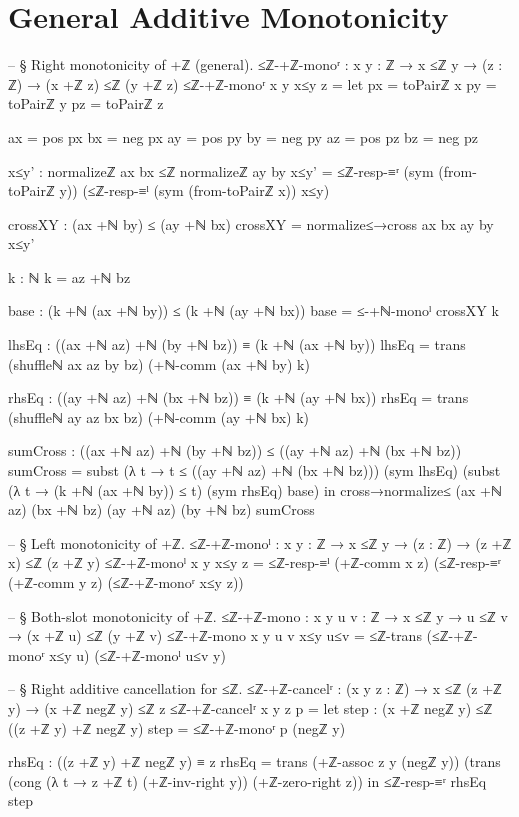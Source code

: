 \documentclass[11pt,a4paper]{book}
\begin{document}
\section{General Additive Monotonicity}

\begin{code}
-- § Right monotonicity of +ℤ (general).
≤ℤ-+ℤ-monoʳ : {x y : ℤ} → x ≤ℤ y → (z : ℤ) → (x +ℤ z) ≤ℤ (y +ℤ z)
≤ℤ-+ℤ-monoʳ {x} {y} x≤y z =
  let
    px = toPairℤ x
    py = toPairℤ y
    pz = toPairℤ z

    ax = pos px
    bx = neg px
    ay = pos py
    by = neg py
    az = pos pz
    bz = neg pz

    x≤y' : normalizeℤ ax bx ≤ℤ normalizeℤ ay by
    x≤y' =
      ≤ℤ-resp-≡ʳ (sym (from-toPairℤ y))
        (≤ℤ-resp-≡ˡ (sym (from-toPairℤ x)) x≤y)

    crossXY : (ax +ℕ by) ≤ (ay +ℕ bx)
    crossXY = normalize≤→cross ax bx ay by x≤y'

    k : ℕ
    k = az +ℕ bz

    base : (k +ℕ (ax +ℕ by)) ≤ (k +ℕ (ay +ℕ bx))
    base = ≤-+ℕ-monoˡ crossXY k

    lhsEq : ((ax +ℕ az) +ℕ (by +ℕ bz)) ≡ (k +ℕ (ax +ℕ by))
    lhsEq =
      trans
        (shuffleℕ ax az by bz)
        (+ℕ-comm (ax +ℕ by) k)

    rhsEq : ((ay +ℕ az) +ℕ (bx +ℕ bz)) ≡ (k +ℕ (ay +ℕ bx))
    rhsEq =
      trans
        (shuffleℕ ay az bx bz)
        (+ℕ-comm (ay +ℕ bx) k)

    sumCross : ((ax +ℕ az) +ℕ (by +ℕ bz)) ≤ ((ay +ℕ az) +ℕ (bx +ℕ bz))
    sumCross =
      subst (λ t → t ≤ ((ay +ℕ az) +ℕ (bx +ℕ bz))) (sym lhsEq)
        (subst (λ t → (k +ℕ (ax +ℕ by)) ≤ t) (sym rhsEq) base)
  in
  cross→normalize≤ (ax +ℕ az) (bx +ℕ bz) (ay +ℕ az) (by +ℕ bz) sumCross

-- § Left monotonicity of +ℤ.
≤ℤ-+ℤ-monoˡ : {x y : ℤ} → x ≤ℤ y → (z : ℤ) → (z +ℤ x) ≤ℤ (z +ℤ y)
≤ℤ-+ℤ-monoˡ {x} {y} x≤y z =
  ≤ℤ-resp-≡ˡ (+ℤ-comm x z)
    (≤ℤ-resp-≡ʳ (+ℤ-comm y z)
      (≤ℤ-+ℤ-monoʳ x≤y z))

-- § Both-slot monotonicity of +ℤ.
≤ℤ-+ℤ-mono : {x y u v : ℤ} → x ≤ℤ y → u ≤ℤ v → (x +ℤ u) ≤ℤ (y +ℤ v)
≤ℤ-+ℤ-mono {x} {y} {u} {v} x≤y u≤v =
  ≤ℤ-trans (≤ℤ-+ℤ-monoʳ x≤y u) (≤ℤ-+ℤ-monoˡ u≤v y)

-- § Right additive cancellation for ≤ℤ.
≤ℤ-+ℤ-cancelʳ : (x y z : ℤ) → x ≤ℤ (z +ℤ y) → (x +ℤ negℤ y) ≤ℤ z
≤ℤ-+ℤ-cancelʳ x y z p =
  let
    step : (x +ℤ negℤ y) ≤ℤ ((z +ℤ y) +ℤ negℤ y)
    step = ≤ℤ-+ℤ-monoʳ p (negℤ y)

    rhsEq : ((z +ℤ y) +ℤ negℤ y) ≡ z
    rhsEq =
      trans
        (+ℤ-assoc z y (negℤ y))
        (trans
          (cong (λ t → z +ℤ t) (+ℤ-inv-right y))
          (+ℤ-zero-right z))
  in
  ≤ℤ-resp-≡ʳ rhsEq step
\end{code}
\end{document}
